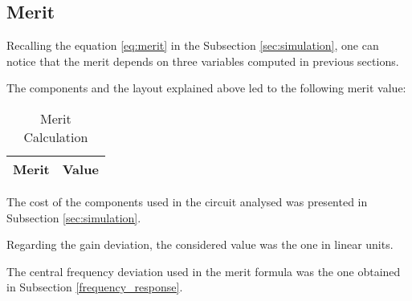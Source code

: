 \subsection{Merit}
\label{merit}

\par Recalling the equation \ref{eq:merit} in the Subsection \ref{sec:simulation}, one can notice that the merit depends on three variables computed in previous sections.
\par The components and the layout explained above led to the following merit value:

\begin{table}[H]
  \centering
  \begin{tabular}{ |l|r| } 
    \hline    
    {\bf Merit} & {\bf Value} \\ \hline
    
  \end{tabular}
  \caption{Merit Calculation}
  \label{tab:merit}
\end{table}

\par The cost of the components used in the circuit analysed was presented in Subsection \ref{sec:simulation}.
\par Regarding the gain deviation, the considered value was the one in linear units.
\par The central frequency deviation used in the merit formula was the one obtained in Subsection \ref{frequency_response}.
